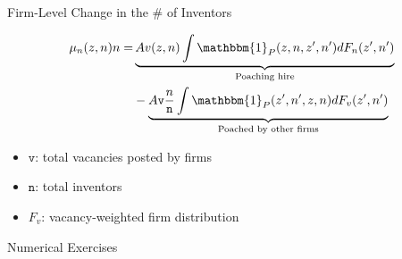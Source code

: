 \documentclass{beamer}
\begin{document}
\begin{frame}{Firm-Level Change in the \# of Inventors}

  \begin{align*}
    \mu_n(z,n)n = &
    \underbrace{A v(z,n) \int \mathbbm{1}_P(z,n,z',n')dF_{n}(z',n')}_{\text{Poaching hire}} \\ & - \underbrace{A \mathtt{v}\frac{n}{\mathtt{n}} \int \mathbbm{1}_P(z',n',z,n)dF_{v}(z',n')}_{\text{Poached by other firms}}
  \end{align*}
  \vspace{-3mm}
  \begin{itemize}
    \item $\mathtt{v}$: total vacancies posted by firms
    \item $\mathtt{n}$: total inventors
    \item $F_{v}$: vacancy-weighted firm distribution
  \end{itemize}
\end{frame}


\begin{frame}{}
  \centering
  {\LARGE Numerical Exercises}
\end{frame}
\end{document}
